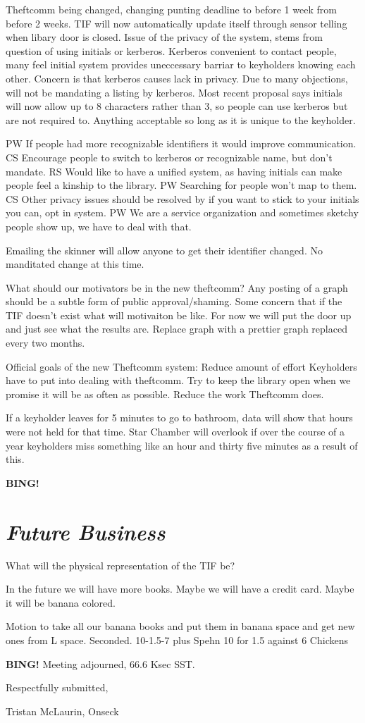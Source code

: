 \documentclass[10pt]{article}
\newcommand{\bing}{{\bf BING!} }
\newcommand{\goto}[1]{\bing \vskip 12pt \section*{{\em{#1}}}}
\newcommand{\ps}{ plus Spehn\xspace}
\newcommand{\onseck}{Tristan McLaurin, Onseck}
\begin{document}
Theftcomm being changed, changing punting deadline to before 1 week from before 2 weeks. TIF will now automatically update itself through sensor telling when libary door is closed. Issue of the privacy of the system, stems from question of using initials or kerberos. Kerberos convenient to contact people, many feel initial system provides uneccessary barriar to keyholders knowing each other. Concern is that kerberos causes lack in privacy. Due to many objections, will not be mandating a listing by kerberos. Most recent proposal says initials will now allow up to 8 characters rather than 3, so people can use kerberos but are not required to. Anything acceptable so long as it is unique to the keyholder. 

PW If people had more recognizable identifiers it would improve communication.
CS Encourage people to switch to kerberos or recognizable name, but don't mandate.
RS Would like to have a unified system, as having initials can make people feel a kinship to the library.
PW Searching for people won't map to them. 
CS Other privacy issues should be resolved by if you want to stick to your initials you can, opt in system.
PW We are a service organization and sometimes sketchy people show up, we have to deal with that.

Emailing the skinner will allow anyone to get their identifier changed. No manditated change at this time.

What should our motivators be in the new theftcomm? Any posting of a graph should be a subtle form of public approval/shaming. Some concern that if the TIF doesn't exist what will motivaiton be like. For now we will put the door up and just see what the results are. Replace graph with a prettier graph replaced every two months.

Official goals of the new Theftcomm system:
Reduce amount of effort Keyholders have to put into dealing with theftcomm. 
Try to keep the library open when we promise it will be as often as possible.
Reduce the work Theftcomm does.

If a keyholder leaves for 5 minutes to go to bathroom, data will show that hours were not held for that time. Star Chamber will overlook if over the course of a year keyholders miss something like an hour and thirty five minutes as a result of this.


\goto{Future Business}
What will the physical representation of the TIF be?

In the future we will have more books. Maybe we will have a credit card. Maybe it will be banana colored.

Motion to take all our banana books and put them in banana space and get new ones from L space.
Seconded.
10-1.5-7\ps
10 for
1.5 against
6 Chickens

\bing
\noindent
Meeting adjourned, 66.6 Ksec SST.

\vspace{18pt}

\centerline{Respectfully submitted,}
\centerline{\onseck}
\end{document}
